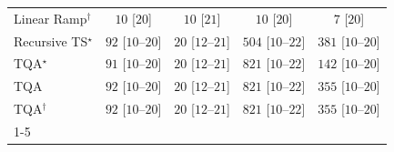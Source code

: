 \begin{tabular}{l|cccc|}
Linear Ramp$^\dagger$ & {\cellcolor[HTML]{F7FCF5}} \color[HTML]{000000} $10$ [$20$] & {\cellcolor[HTML]{F7FCF5}} \color[HTML]{000000} $10$ [$21$] & {\cellcolor[HTML]{F7FCF5}} \color[HTML]{000000} $10$ [$20$] & {\cellcolor[HTML]{F7FCF5}} \color[HTML]{000000} $7$ [$20$] \\
Recursive TS$^\star$ & {\cellcolor[HTML]{E8F6E4}} \color[HTML]{000000} $92$ [$10$--$20$] & {\cellcolor[HTML]{F5FBF2}} \color[HTML]{000000} $20$ [$12$--$21$] & {\cellcolor[HTML]{48AE60}} \color[HTML]{F1F1F1} $504$ [$10$--$22$] & {\cellcolor[HTML]{84CC83}} \color[HTML]{000000} $381$ [$10$--$20$] \\
TQA$^\star$ & {\cellcolor[HTML]{E8F6E4}} \color[HTML]{000000} $91$ [$10$--$20$] & {\cellcolor[HTML]{F5FBF2}} \color[HTML]{000000} $20$ [$12$--$21$] & {\cellcolor[HTML]{00451C}} \color[HTML]{F1F1F1} $821$ [$10$--$22$] & {\cellcolor[HTML]{DBF1D6}} \color[HTML]{000000} $142$ [$10$--$20$] \\
TQA & {\cellcolor[HTML]{E8F6E4}} \color[HTML]{000000} $92$ [$10$--$20$] & {\cellcolor[HTML]{F5FBF2}} \color[HTML]{000000} $20$ [$12$--$21$] & {\cellcolor[HTML]{00451C}} \color[HTML]{F1F1F1} $821$ [$10$--$22$] & {\cellcolor[HTML]{90D18D}} \color[HTML]{000000} $355$ [$10$--$20$] \\
TQA$^\dagger$ & {\cellcolor[HTML]{E8F6E4}} \color[HTML]{000000} $92$ [$10$--$20$] & {\cellcolor[HTML]{F5FBF2}} \color[HTML]{000000} $20$ [$12$--$21$] & {\cellcolor[HTML]{00451C}} \color[HTML]{F1F1F1} $821$ [$10$--$22$] & {\cellcolor[HTML]{90D18D}} \color[HTML]{000000} $355$ [$10$--$20$] \\
\cline{1-5}
\bottomrule
\end{tabular}
